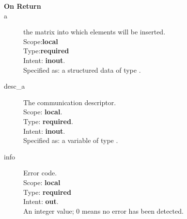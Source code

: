 \begin{description}
\item[\bf On Return]
\item[a] the matrix into which elements will be inserted.\\
Scope:{\bf local}\\
Type:{\bf required}\\
Intent: {\bf inout}.\\
Specified as: a structured data of type \spdata.
\item[desc\_a] The communication descriptor.\\
Scope: {\bf local}. \\
Type: {\bf required}.\\
Intent: {\bf inout}.\\
Specified as: a variable of type \descdata.\\
\item[info] Error code.\\
Scope: {\bf local} \\
Type: {\bf required} \\
Intent: {\bf out}.\\
An integer value; 0 means no error has been detected. 
\end{description}

